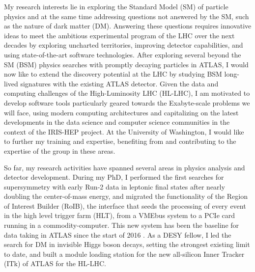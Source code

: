 \documentclass[a4paper]{article}
\begin{document}
\thispagestyle{fancy} 
 \lfoot{} \rfoot{\bf \thepage} \cfoot{}

\fontsize{11}{14}
\selectfont

My research interests lie in exploring the Standard Model (SM) of particle physics and at the same time addressing questions not answered by the SM, such as the nature of dark matter (DM). Answering these questions requires innovative ideas to meet the ambitious experimental program of the LHC over the next decades by exploring uncharted territories, improving detector capabilities, and using state-of-the-art software technologies. After exploring several beyond the SM (BSM) physics searches with promptly decaying particles in ATLAS, I would now like to extend the discovery potential at the LHC by studying BSM long-lived signatures with the existing ATLAS detector. Given the data and computing challenges of the High-Luminosity LHC (HL-LHC), I am motivated to develop software tools particularly geared towards the Exabyte-scale problems we will face, using modern computing architectures and capitalizing on the latest developments in the data science and computer science communities in the context of the IRIS-HEP project. At the University of Washington, I would like to further my training and expertise, benefiting from and contributing to the expertise of the group in these areas.

\bigskip

So far, my research activities have spanned several areas in physics analysis and detector development. During my PhD, I performed the first searches for supersymmetry with early Run-2 data in leptonic final states after nearly doubling the center-of-mass energy\cite{SS3L}, and migrated the functionality of the Region of Interest Builder (RoIB), the interface that seeds the processing of every event in the high level trigger farm (HLT), from a VMEbus system to a PCIe card running in a commodity-computer. This new system has been the baseline for data taking in ATLAS since the start of 2016 \cite{proc-TWEPP2015-RoIB}. As a DESY fellow, I led the search for DM in invisible Higgs boson decays, setting the strongest existing limit to date, and built a module loading station for the new all-silicon Inner Tracker (ITk) of ATLAS for the HL-LHC.
\end{document}
